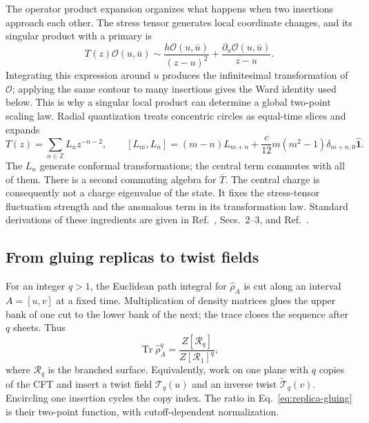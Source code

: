 \documentclass[aps,prb,onecolumn,nofootinbib,superscriptaddress]{revtex4-2}
\newcommand{\One}{\hat{\mathbf{1}}}
\newcommand{\Tr}{\operatorname{Tr}}
\begin{document}
The operator product expansion organizes what happens when two
insertions approach each other. The stress tensor generates local
coordinate changes, and its singular product with a primary is
\begin{equation}
 T(z)\mathcal O(u,\bar u)\sim
 \frac{h\mathcal O(u,\bar u)}{(z-u)^2}
 +\frac{\partial_u\mathcal O(u,\bar u)}{z-u}.
 \label{eq:T-primary}
\end{equation}
Integrating this expression around $u$ produces the infinitesimal
transformation of $\mathcal O$; applying the same contour to many insertions
gives the Ward identity used below. This is why a singular local product
can determine a global two-point scaling law. Radial quantization treats
concentric circles as equal-time slices and expands
\begin{equation}
 T(z)=\sum_{n\in\mathbb Z}L_nz^{-n-2},\qquad
 [L_m,L_n]=(m-n)L_{m+n}
       +\frac{c}{12}m(m^2-1)\delta_{m+n,0}\One.
 \label{eq:virasoro}
\end{equation}
The $L_n$ generate conformal transformations; the central term commutes
with all of them. There is a second commuting algebra for $\bar T$.
The central charge is consequently not a charge eigenvalue of the state.
It fixes the stress-tensor fluctuation strength and the anomalous term in
its transformation law. Standard derivations of these ingredients are
given in Ref.~\cite{Ginsparg1989}, Secs.~2--3, and
Ref.~\cite{DiFrancescoMathieuSenechal1997}.

\subsection{From gluing replicas to twist fields}
For an integer $q>1$, the Euclidean path integral for $\hat\rho_A$ is cut
along an interval $A=[u,v]$ at a fixed time. Multiplication of density
matrices glues the upper bank of one cut to the lower bank of the next;
the trace closes the sequence after $q$ sheets. Thus
\begin{equation}
 \Tr\hat\rho_A^q=\frac{Z[\mathcal R_q]}{Z[\mathcal R_1]^q},
 \label{eq:replica-gluing}
\end{equation}
where $\mathcal R_q$ is the branched surface. Equivalently, work on one
plane with $q$ copies of the CFT and insert a twist field $\mathcal T_q(u)$
and an inverse twist $\widetilde{\mathcal T}_q(v)$. Encircling one insertion
cycles the copy index. The ratio in Eq.~\eqref{eq:replica-gluing} is their
two-point function, with cutoff-dependent normalization.
\end{document}
